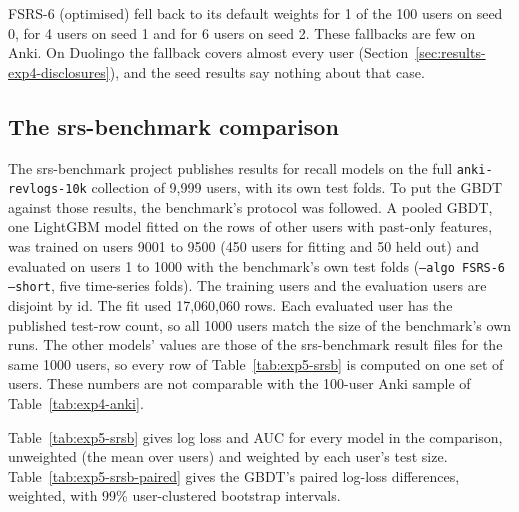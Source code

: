 FSRS-6 (optimised) fell back to its default weights for 1 of the 100 users on seed 0, for 4 users on seed 1 and for 6 users on
seed 2. These fallbacks are few on Anki. On Duolingo the fallback covers almost every user (Section~\ref{sec:results-exp4-disclosures}),
and the seed results say nothing about that case.

\subsection{The srs-benchmark comparison}
\label{sec:results-exp5-srsb}

The srs-benchmark project \cite{srsbenchmark} publishes results for recall models on the full \texttt{anki-revlogs-10k}
collection of 9,999 users, with its own test folds. To put the GBDT against those results, the benchmark's protocol was
followed. A pooled GBDT, one LightGBM model fitted on the rows of other users with past-only features, was trained on
users 9001 to 9500 (450 users for fitting and 50 held out) and evaluated on users 1 to 1000 with the benchmark's own test
folds (\texttt{--algo FSRS-6 --short}, five time-series folds). The training users and the evaluation users are disjoint by
id. The fit used 17,060,060 rows. Each evaluated user has the published test-row count, so all 1000 users match the size of
the benchmark's own runs. The other models' values are those of the srs-benchmark result files for the same 1000 users, so
every row of Table~\ref{tab:exp5-srsb} is computed on one set of users. These numbers are not comparable with the 100-user
Anki sample of Table~\ref{tab:exp4-anki}.

Table~\ref{tab:exp5-srsb} gives log loss and AUC for every model in the comparison, unweighted (the mean over users) and
weighted by each user's test size. Table~\ref{tab:exp5-srsb-paired} gives the GBDT's paired log-loss differences, weighted,
with 99\% user-clustered bootstrap intervals.

